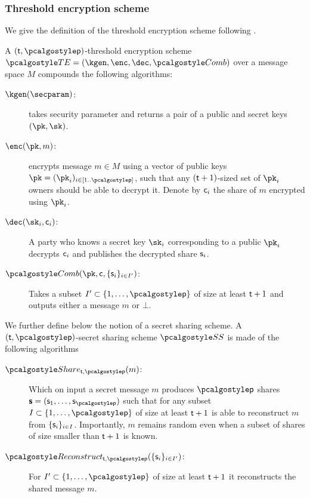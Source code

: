 \documentclass[runningheads,10pt]{llncs}
\numberwithin{equation}{section}
\begin{document}
\subsubsection{Threshold encryption scheme}

We give the definition of the threshold encryption scheme following
\cite{EPRINT:DGKOS20}.

A $(\threshold, \noofparties)$-threshold encryption scheme $\TENC = (\kgen,
\enc, \dec, \combine)$ over a message space $M$ compounds the following
algorithms:
\begin{description}
  \item[$\kgen(\secparam)$:] takes security parameter and returns a pair of a
  public and secret keys $(\pk, \sk)$.
  \item[$\enc(\vec{\pk}, m)$:] encrypts message $m \in M$ using a vector of
  public keys $\vec{\pk} = (\pk_i)_{i \in \range{1}{\noofparties}}$, such that
  any $(\mathsf{t} + 1)$-sized set of $\pk_i$ owners should be able to decrypt
  it. Denote by $\mathsf{c}_i$ the share of $m$ encrypted using $\pk_i$.
  \item[$\dec(\sk_i, \ciphertext_i)$:] A party who knows a secret key $\sk_i$
  corresponding to a public $\pk_i$ decrypts $\mathsf{c}_i$ and publishes the
  decrypted share $\mathsf{s}_i$.
  \item[$ \combine(\vec{\pk}, \ciphertext, \smallset{\varshare_i}_{i \in I'})$:]
  Takes a subset $I' \subset \smallset{1, \ldots, \noofparties}$ of size at
  least $\mathsf{t} + 1$ and outputs either a message $m$ or $\bot$.
\end{description}

We further define below the notion of a secret sharing scheme.
%
A $(\threshold, \noofparties)$-secret sharing scheme $\SS$ is made of the
following algorithms
\begin{description}
  \item[$\share_{\threshold, \noofparties}(m)$:] Which on input a secret
  message $m$ produces $\noofparties$ shares $\vec{\varshare} = (\varshare_1,
  \ldots, \varshare_\noofparties)$ such that for any subset $I \subset
  \smallset{1, \ldots, \noofparties}$ of size at least $\mathsf{t} + 1$ is able
  to reconstruct $m$ from $\{\mathsf{s}_i\}_{i \in I}$. Importantly, $m$
  remains random even when a subset of shares of size smaller than $\mathsf{t}
  + 1$ is known.
  \item[$\reconstruct_{\threshold, \noofparties}(\smallset{\varshare_i}_{i \in
  I'})$:] For $I' \subset \smallset{1, \ldots, \noofparties}$ of size at least
  $\mathsf{t} + 1$ it reconstructs the shared message $m$.
\end{description}
\end{document}
